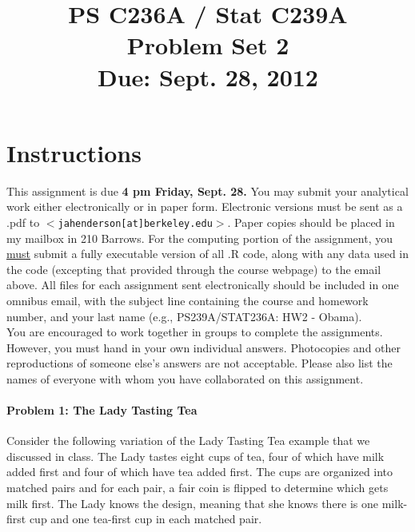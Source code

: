 \documentclass{article}
\title{PS C236A / Stat C239A \\ Problem Set 2 \\ Due: Sept. 28, 2012}
\date{}
\begin{document}
\maketitle
\vspace{-4em}
\section*{Instructions}
This assignment is due {\bf 4 pm Friday, Sept. 28.}  You may submit
your analytical work either electronically or in paper form.
Electronic versions must be sent as a .pdf to
$<$\texttt{jahenderson[at]berkeley.edu}$>$. Paper copies should be
placed in my mailbox in 210 Barrows.  For the computing portion of the
assignment, you \underline{must} submit a fully executable version of
all .R code, along with any data used in the code (excepting that
provided through the course webpage) to the email above.  All files
for each assignment sent electronically should be included in one
omnibus email, with the subject line containing the course and
homework number, and your last name (e.g., PS239A/STAT236A: HW2 - Obama).\\







\noindent You are encouraged to work together in groups to complete
the assignments. However, you must hand in your own individual
answers. Photocopies and other reproductions of someone else’s answers
are not acceptable. Please also list the names of everyone with
whom you have collaborated on this assignment.








\paragraph{Problem 1: The Lady Tasting Tea }
Consider the following variation of the Lady Tasting Tea example that we discussed in class. The Lady tastes eight cups of tea, four of which have milk added first and four of which have tea added first. The cups are organized into matched pairs and for each pair, a fair coin is flipped to determine which gets milk first. The Lady knows the design, meaning that she knows there is one milk-first cup and one tea-first cup in each matched pair.
\end{document}
